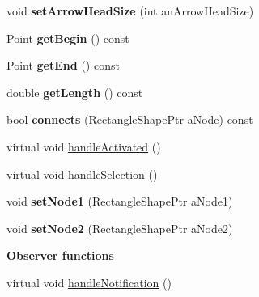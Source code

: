 \begin{DoxyCompactItemize}
\item 
void {\bfseries set\+Arrow\+Head\+Size} (int an\+Arrow\+Head\+Size)\hypertarget{class_view_1_1_line_shape_a3984d3a088b05bfcd42b0dc6bd25ad05}{}\label{class_view_1_1_line_shape_a3984d3a088b05bfcd42b0dc6bd25ad05}

\item 
Point {\bfseries get\+Begin} () const \hypertarget{class_view_1_1_line_shape_afd1c59f2e5d16ea338cb13bcee7238e0}{}\label{class_view_1_1_line_shape_afd1c59f2e5d16ea338cb13bcee7238e0}

\item 
Point {\bfseries get\+End} () const \hypertarget{class_view_1_1_line_shape_a80ae31b43cd8370771a900e4f9aee883}{}\label{class_view_1_1_line_shape_a80ae31b43cd8370771a900e4f9aee883}

\item 
double {\bfseries get\+Length} () const \hypertarget{class_view_1_1_line_shape_ae42912ba4477d893a5d21b65410d9053}{}\label{class_view_1_1_line_shape_ae42912ba4477d893a5d21b65410d9053}

\item 
bool {\bfseries connects} (Rectangle\+Shape\+Ptr a\+Node) const \hypertarget{class_view_1_1_line_shape_afb683de0d0b2218330ce566fe29baa2d}{}\label{class_view_1_1_line_shape_afb683de0d0b2218330ce566fe29baa2d}

\item 
virtual void \hyperlink{class_view_1_1_line_shape_a377b62d54ef2aa35fb325fed70dc8863}{handle\+Activated} ()
\item 
virtual void \hyperlink{class_view_1_1_line_shape_a26cc81c55e98316763ddb33b227e80ae}{handle\+Selection} ()
\item 
void {\bfseries set\+Node1} (Rectangle\+Shape\+Ptr a\+Node1)\hypertarget{class_view_1_1_line_shape_a0c24c5c1d322a05f0ff54878e21de6e8}{}\label{class_view_1_1_line_shape_a0c24c5c1d322a05f0ff54878e21de6e8}

\item 
void {\bfseries set\+Node2} (Rectangle\+Shape\+Ptr a\+Node2)\hypertarget{class_view_1_1_line_shape_a65512e5a2c699118bdd2813056d13fa4}{}\label{class_view_1_1_line_shape_a65512e5a2c699118bdd2813056d13fa4}

\end{DoxyCompactItemize}
\begin{Indent}{\bf Observer functions}\par
\begin{DoxyCompactItemize}
\item 
virtual void \hyperlink{class_view_1_1_line_shape_a21a183cd9f63130fe48497743c2c4abb}{handle\+Notification} ()
\end{DoxyCompactItemize}
\end{Indent}
